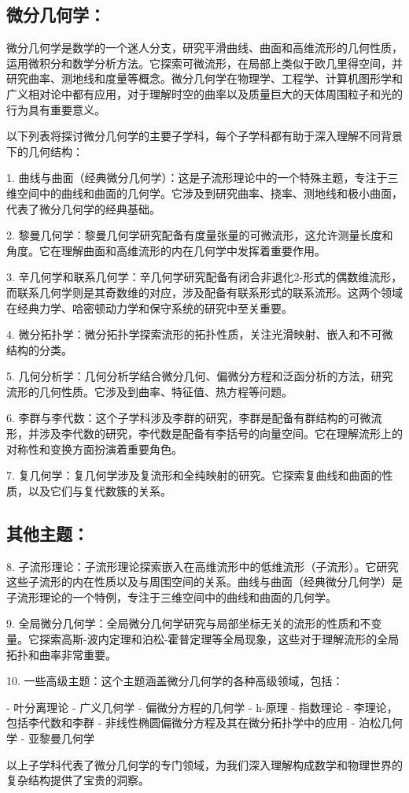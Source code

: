 
\subsection{微分几何学：}

微分几何学是数学的一个迷人分支，研究平滑曲线、曲面和高维流形的几何性质，运用微积分和数学分析方法。它探索可微流形，在局部上类似于欧几里得空间，并研究曲率、测地线和度量等概念。微分几何学在物理学、工程学、计算机图形学和广义相对论中都有应用，对于理解时空的曲率以及质量巨大的天体周围粒子和光的行为具有重要意义。

以下列表将探讨微分几何学的主要子学科，每个子学科都有助于深入理解不同背景下的几何结构：

1. 曲线与曲面（经典微分几何学）：这是子流形理论中的一个特殊主题，专注于三维空间中的曲线和曲面的几何学。它涉及到研究曲率、挠率、测地线和极小曲面，代表了微分几何学的经典基础。

2. 黎曼几何学：黎曼几何学研究配备有度量张量的可微流形，这允许测量长度和角度。它在理解曲面和高维流形的内在几何学中发挥着重要作用。

3. 辛几何学和联系几何学：辛几何学研究配备有闭合非退化2-形式的偶数维流形，而联系几何学则是其奇数维的对应，涉及配备有联系形式的联系流形。这两个领域在经典力学、哈密顿动力学和保守系统的研究中至关重要。

4. 微分拓扑学：微分拓扑学探索流形的拓扑性质，关注光滑映射、嵌入和不可微结构的分类。

5. 几何分析学：几何分析学结合微分几何、偏微分方程和泛函分析的方法，研究流形的几何性质。它涉及到曲率、特征值、热方程等问题。

6. 李群与李代数：这个子学科涉及李群的研究，李群是配备有群结构的可微流形，并涉及李代数的研究，李代数是配备有李括号的向量空间。它在理解流形上的对称性和变换方面扮演着重要角色。

7. 复几何学：复几何学涉及复流形和全纯映射的研究。它探索复曲线和曲面的性质，以及它们与复代数簇的关系。

\subsection{其他主题：}

8. 子流形理论：子流形理论探索嵌入在高维流形中的低维流形（子流形）。它研究这些子流形的内在性质以及与周围空间的关系。曲线与曲面（经典微分几何学）是子流形理论的一个特例，专注于三维空间中的曲线和曲面的几何学。

9. 全局微分几何学：全局微分几何学研究与局部坐标无关的流形的性质和不变量。它探索高斯-波内定理和泊松-霍普定理等全局现象，这些对于理解流形的全局拓扑和曲率非常重要。

10. 一些高级主题：这个主题涵盖微分几何学的各种高级领域，包括：

   - 叶分离理论
   - 广义几何学
   - 偏微分方程的几何学
   - h-原理
   - 指数理论
   - 李理论，包括李代数和李群
   - 非线性椭圆偏微分方程及其在微分拓扑学中的应用
   - 泊松几何学
   - 亚黎曼几何学

以上子学科代表了微分几何学的专门领域，为我们深入理解构成数学和物理世界的复杂结构提供了宝贵的洞察。
